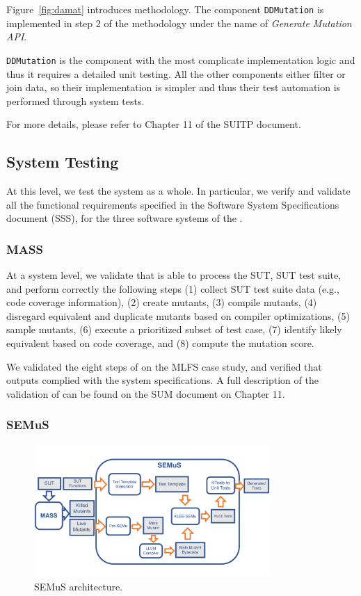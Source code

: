 Figure~\ref{fig:damat} introduces \MASS methodology. The component \texttt{DDMutation} is implemented in step 2 of the methodology under the name of \emph{Generate Mutation API}.

\texttt{DDMutation} is the component with the most complicate implementation logic and thus it requires a detailed unit testing. All the other components either filter or join data, so their implementation is simpler and thus their test automation is performed through system tests.

For more details, please refer to Chapter 11 of the SUITP document.

\subsection{System Testing}

At this level, we test the system as a whole. In particular, we verify and validate all the functional requirements specified in the Software System Specifications document (SSS), for the three software systems of the \FAQAS.

\subsubsection{MASS}

At a system level, we validate that \MASS is able to process the SUT, SUT test suite, and perform correctly the following steps (1) collect SUT test suite data (e.g., code coverage information), (2) create mutants, (3) compile mutants, (4) disregard equivalent and duplicate mutants based on compiler optimizations, (5) sample mutants, (6) execute a prioritized subset of test case, (7) identify likely equivalent based on code coverage, and (8) compute the mutation score.

We validated the eight steps of \MASS on the MLFS case study, and verified that outputs complied with the system specifications. A full description of the validation of \MASS can be found on the SUM document on Chapter 11.

\subsubsection{SEMuS}

\begin{figure}[t]
  \centering
  \includegraphics[width=0.8\textwidth]{images/semus-architecture.pdf}
      \caption{SEMuS architecture.}
      \label{fig:semus}
\end{figure}

